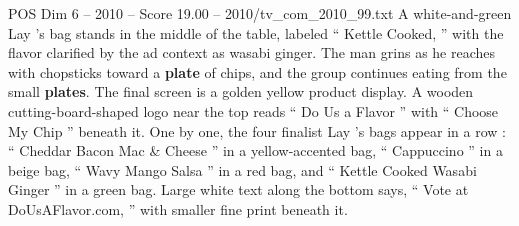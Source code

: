 \begin{textsample}{POS Dim 6 – 2010 – Score 19.00 – 2010/tv\_com\_2010\_99.txt}
A white-and-green Lay ’s bag stands in the middle of the table, labeled “ Kettle Cooked, ” with the flavor clarified by the ad context as wasabi ginger.
The man grins as he reaches with chopsticks toward a \textbf{plate} of chips, and the group continues eating from the small \textbf{plates}.
The final screen is a golden yellow product display.
A wooden cutting-board-shaped logo near the top reads “ Do Us a Flavor ” with “ Choose My Chip ” beneath it.
One by one, the four finalist Lay ’s bags appear in a row : “ Cheddar Bacon Mac \& Cheese ” in a yellow-accented bag, “ Cappuccino ” in a beige bag, “ Wavy Mango Salsa ” in a red bag, and “ Kettle Cooked Wasabi Ginger ” in a green bag.
Large white text along the bottom says, “ Vote at DoUsAFlavor.com, ” with smaller fine print beneath it.

\end{textsample}
